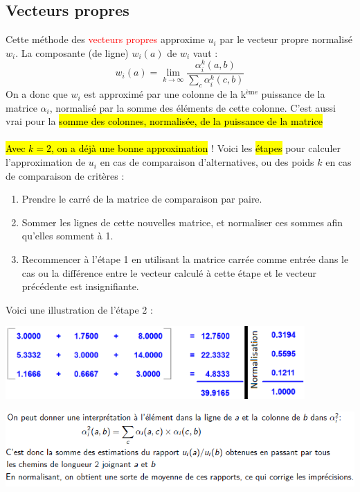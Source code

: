 \documentclass[a4paper, 12pt]{article}
\newcommand{\alinea}{
\hspace*{0.5cm}}
\newcommand{\red}[1]{
	\textcolor{red}{#1}}
\begin{document}
	\subsection{Vecteurs propres}
		\alinea Cette méthode des \red{vecteurs propres} approxime $u_i$ par le vecteur propre normalisé $w_i$.
			La composante (de ligne) $w_i (a)$ de $w_i$ vaut : 
			$$ w_i (a) = \lim\limits_{k \rightarrow \infty} \frac{\alpha_i^k (a, b)}{\sum\limits_{c} \alpha_i^k(c, b)} $$
			On a donc que $w_i$ est approximé par une colonne de la k$^{\text{ème}}$ puissance de la matrice $\alpha_i$, normalisé
			par la somme des éléments de cette colonne. C'est aussi vrai pour la \hl{somme des colonnes, normalisée, de la puissance de la
			matrice}\\
		~\\
		\alinea \hl{Avec $k = 2$, on a déjà une bonne approximation} !  Voici les \hl{étapes} pour calculer l'approximation de $u_i$ 
			en cas de comparaison d'alternatives, ou des poids $k$ en cas de comparaison de critères :
			\begin{enumerate}
				\setlength\itemsep{0cm}
				\item Prendre le carré de la matrice de comparaison par paire.
				\item Sommer les lignes de cette nouvelles matrice, et normaliser ces sommes afin qu'elles somment à 1.
				\item Recommencer à l'étape 1 en utilisant la matrice carrée comme entrée dans le cas ou la différence
					entre le vecteur calculé à cette étape et le vecteur précédente est insignifiante.
			\end{enumerate}
		Voici une illustration de l'étape 2 : 
		\begin{center}
			\includegraphics[width=4.5in]{Images/ahp}
		\end{center}
	\begin{center}
		\includegraphics[width=\textwidth]{Images/ahp2}
	\end{center}
\end{document}
